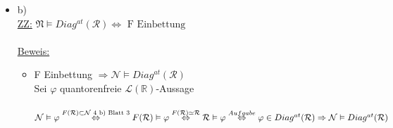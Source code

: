 \documentclass[a4paper]{scrartcl}
\begin{document}
\begin{itemize}
\newpage

        \item b)\\
            \underline{ZZ:} $ \mathfrak{N} \vDash Diag^{at}(\mathcal{R}) \Leftrightarrow \text{ F Einbettung}$\\
            \\\underline{Beweis:}\\
            \begin{itemize}
                \item F Einbettung $\Rightarrow \mathcal{N} \vDash Diag^{at}(\mathcal{R})$\\
                    Sei $\varphi$ quantorenfreie $ \mathscr{L}(\mathds{R})$-Aussage\\
                    \\$\mathcal{N} \vDash \varphi\\
                    \overset{F(\mathcal{R}) \subset \mathcal{N}\text{ 4 b) Blatt 3}}{\Leftrightarrow} F(\mathcal{R}) \vDash \varphi\\
                    \overset{F(\mathcal{R}) \simeq \mathcal{R}}{\Leftrightarrow} \mathcal{R} \vDash \varphi\\
                    \overset{Aufgabe}{\Leftrightarrow} \varphi \in Diag^{at}(\mathcal{R})\\
                    \\\Rightarrow \mathcal{N} \vDash Diag^{at}(\mathcal{R})$\\


\end{itemize}
\end{itemize}
\end{document}
